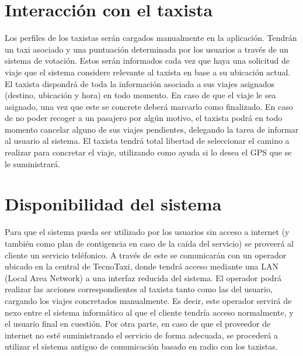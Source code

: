 \section{Interacción con el taxista}
Los perfiles de los taxistas serán cargados manualmente en la aplicación. Tendrán un taxi asociado y una puntuación determinada por los usuarios a través de un sistema de votación. Estos serán informados cada vez que haya una solicitud de viaje que el sistema considere relevante al taxista en base a su ubicación actual. El taxista dispondrá de toda la información asociada a sus viajes asignados (destino, ubicación y hora) en todo momento. En caso de que el viaje le sea asignado, una vez que este se concrete deberá marcarlo como finalizado. En caso de no poder recoger a un pasajero por algún motivo, el taxista podrá en todo momento cancelar alguno de sus viajes pendientes, delegando la tarea de informar al usuario al sistema. El taxista tendrá total libertad de seleccionar el camino a realizar para concretar el viaje, utilizando como ayuda si lo desea el GPS que se le suministrará.

\section{Disponibilidad del sistema}
Para que el sistema pueda ser utilizado por los usuarios sin acceso a internet (y también como plan de contigencia en caso de la caída del servicio) se proveerá al cliente un servicio teléfonico. A través de este se comunicarán con un operador ubicado en la central de TecnoTaxi, donde tendrá acceso mediante una LAN (Local Area Network) a una interfaz reducida del sistema. El operador podrá realizar las acciones correspondientes al taxista tanto como las del usuario, cargando los viajes concretados manualmente. Es decir, este operador servirá de nexo entre el sistema informático al que el cliente tendría acceso normalmente, y el usuario final en cuestión. Por otra parte, en caso de que el proveedor de internet no esté suministrando el servicio de forma adecuada, se procederá a utilizar el sistema antiguo de comunicación basado en radio con los taxistas.


